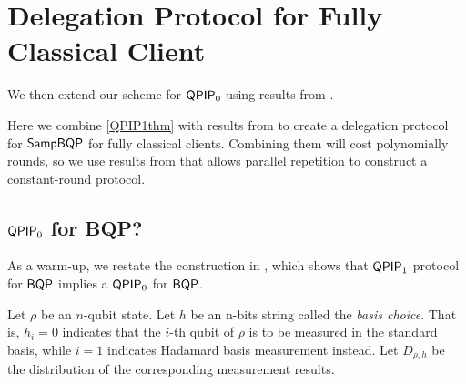 \section{Delegation Protocol for Fully Classical Client}


We then extend our scheme for $\operatorname{\mathsf{QPIP}}_0$ using results from \cite{FOCS:Mahadev18a}.

Here we combine \cref{QPIP1thm} with results from \cite{FOCS:Mahadev18a} to create a delegation protocol for $\operatorname{\mathsf{SampBQP}}$ for fully classical clients. Combining them will cost polynomially rounds, so we use results from \cite{parallelrep} that allows parallel repetition to construct a constant-round protocol.


\subsection{$\operatorname{\mathsf{QPIP}}_0$ for BQP?}
As a warm-up, we  restate the construction in \cite{FOCS:Mahadev18a}, which shows that $\operatorname{\mathsf{QPIP}}_1$ protocol for $\operatorname{\mathsf{BQP}}$ implies a $\operatorname{\mathsf{QPIP}}_0$ for $\operatorname{\mathsf{BQP}}$.

Let $\rho$ be an $n$-qubit state. Let $h$ be an n-bits string called the \emph{basis choice}. That is, $h_i=0$ indicates that the $i$-th qubit of $\rho$ is to be measured in the standard basis, while $i=1$ indicates Hadamard basis measurement instead. Let $D_{\rho, h}$ be the distribution of the corresponding measurement results.




